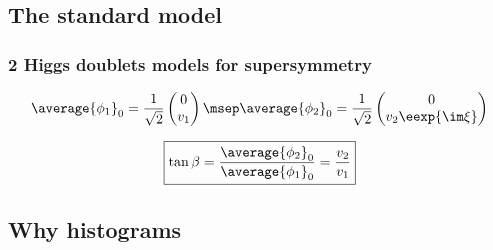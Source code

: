 
\begin{frame}


\end{frame}

\subsection*{The standard model}


\begin{frame}
\frametitle{2 Higgs doublets models for supersymmetry}
\begin{equation*}
\average{\phi_1}_0 = \frac{1}{\sqrt{2}} \begin{pmatrix}
0\\v_1
\end{pmatrix}
\msep
\average{\phi_2}_0 = \frac{1}{\sqrt{2}} \begin{pmatrix}
0\\v_2 \eexp{\im\xi}
\end{pmatrix}
\end{equation*}

\begin{equation*}
\boxed{\tan\beta = \frac{\average{\phi_2}_0}{\average{\phi_1}_0} = \frac{v_2}{v_1}}
\end{equation*}

\end{frame}

\subsection*{Why histograms}
